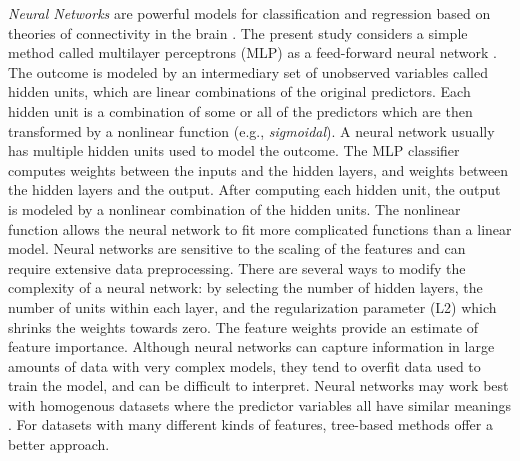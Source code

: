 \documentclass[sigconf]{acmart}
\begin{document}
\emph{Neural Networks} are powerful models for classification and 
regression based on theories of connectivity in the brain \cite{kuhn13}. 
The present study considers a simple method called multilayer perceptrons 
(MLP) as a feed-forward neural network \cite{muller17, raschka17}. 
The outcome is modeled by an intermediary set of unobserved variables called 
hidden units, which are linear combinations of the original predictors. 
Each hidden unit is a combination of some or all of the predictors which 
are then transformed by a nonlinear function (e.g., \emph{sigmoidal}). A 
neural network usually has multiple hidden units used to model the outcome. 
The MLP classifier computes weights between the inputs and the hidden layers, 
and weights between the hidden layers and the output. After computing each 
hidden unit, the output is modeled by a nonlinear combination of the hidden 
units. The nonlinear function allows the neural network to fit more 
complicated functions than a linear model. Neural networks are sensitive to 
the scaling of the features and can require extensive data preprocessing. 
There are several ways to modify the complexity of a neural network: by 
selecting the number of hidden layers, the number of units within each 
layer, and the regularization parameter (L2) which shrinks the weights 
towards zero. The feature weights provide an estimate of feature importance.
Although neural networks can capture information in large amounts of data 
with very complex models, they tend to overfit data used to train the model, 
and can be difficult to interpret. Neural networks may work best with 
homogenous datasets where the predictor variables all have similar meanings 
\cite{muhuri13}. For datasets with many different kinds of features, 
tree-based methods offer a better approach.

\end{document}
